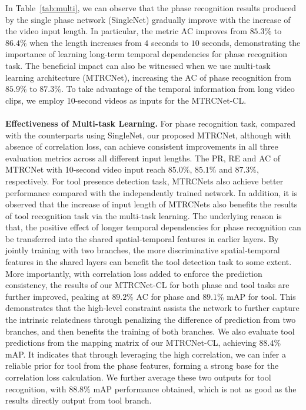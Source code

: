 \documentclass{elsarticle}
\begin{document}
In Table~\ref{tab:multi}, we can observe that the phase recognition results produced by the single phase network (SingleNet) gradually improve with the increase of the video input length.
In particular, the metric AC improves from $85.3\%$ to $86.4\%$ when the length increases from $4$ seconds to $10$ seconds,
demonstrating the importance of learning long-term temporal dependencies for phase recognition task.
The beneficial impact can also be witnessed when we use multi-task learning architecture (MTRCNet), increasing the AC of phase recognition from $85.9\%$ to $87.3\%$.
To take advantage of the temporal information from long video clips, we employ 10-second videos as inputs for the MTRCNet-CL.
\\
\\
\textbf{Effectiveness of Multi-task Learning.}
For phase recognition task, compared with the counterparts using SingleNet, our proposed MTRCNet, although with absence of correlation loss, can achieve consistent improvements in all three evaluation metrics across all different input lengths.
The PR, RE and AC of MTRCNet with 10-second video input reach $85.0\%$, $85.1\%$ and $87.3\%$, respectively.
For tool presence detection task, MTRCNets also achieve better performance compared with the independently trained network.
In addition, it is observed that the increase of input length of MTRCNets also benefits the results of tool recognition task via the multi-task learning.
The underlying reason is that, the positive effect of longer temporal dependencies for phase recognition can be transferred into the shared  spatial-temporal features in earlier layers. 
By jointly training with two branches, the more discriminative spatial-temporal features in the shared layers can benefit the tool detection task to some extent. 
More importantly, with correlation loss added to enforce the prediction consistency, the results of our MTRCNet-CL for both phase and tool tasks are further improved, peaking at $89.2\%$ AC for phase and $89.1\%$ mAP for tool.
This demonstrates that the high-level constraint assists the network to further capture the intrinsic relatedness through penalizing the difference of prediction from two branches, and then benefits the training of both branches.
We also evaluate tool predictions from the mapping matrix of our MTRCNet-CL, achieving $88.4\%$ mAP.
It indicates that through leveraging the high correlation, we can infer a reliable prior for tool from the phase features, forming a strong base for the correlation loss calculation.
We further average these two outputs for tool recognition, with $88.8\%$ mAP performance obtained, which is not as good as the results directly output from tool branch.
\end{document}
